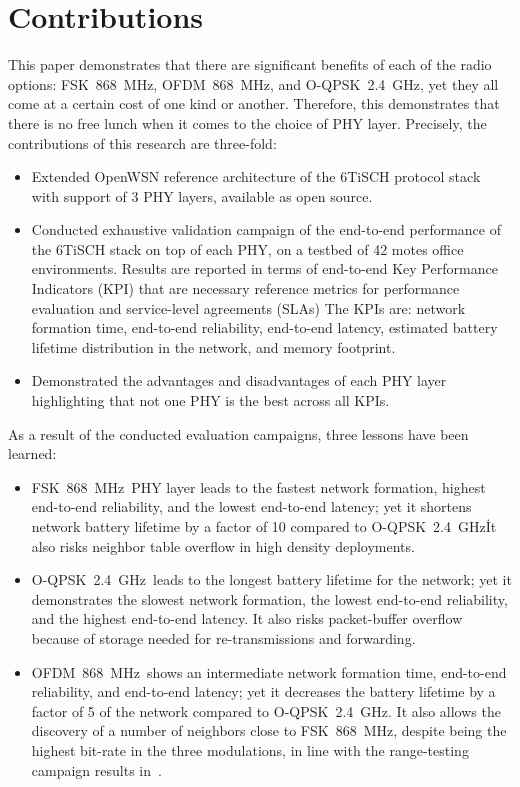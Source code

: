 \documentclass[sensors,article,submit,moreauthors,pdftex]{Definitions/mdpi}
\newcommand{\fsk}          {FSK~868~MHz}
\newcommand{\oqpsk}        {O-QPSK~2.4~GHz}
\newcommand{\ofdm}         {OFDM~868~MHz}
\begin{document}
\section{Contributions}
\label{sec:contributions}

This paper demonstrates that there are significant benefits of each of the radio options: \fsk, \ofdm, and \oqpsk, yet they all come at a certain cost of one kind or another.
Therefore, this demonstrates that there is no free lunch when it comes to the choice of PHY layer.
Precisely, the contributions of this research are three-fold:

\begin{itemize}
    \item Extended OpenWSN reference architecture of the 6TiSCH protocol stack with support of 3 PHY layers, available as open source.
    \item Conducted exhaustive validation campaign of the end-to-end performance of the 6TiSCH stack on top of each PHY, on a testbed of 42 motes office environments.
        Results are reported in terms of end-to-end Key Performance Indicators (KPI) that are necessary reference metrics for performance evaluation and service-level agreements (SLAs)
        The KPIs are: 
            network formation time,
            end-to-end reliability,
            end-to-end latency, 
            estimated battery lifetime distribution in the network, and
            memory footprint.
    \item Demonstrated the advantages and disadvantages of each PHY layer highlighting that not one PHY is the best across all KPIs.
\end{itemize}

As a result of the conducted evaluation campaigns, three lessons have been learned:


\begin{itemize}
    \item \fsk\ PHY layer leads to the fastest network formation, highest end-to-end reliability, and the lowest end-to-end latency; yet it shortens network battery lifetime by a factor of 10 compared to \oqpsk\. 
        It also risks neighbor table overflow in high density deployments.
    \item \oqpsk\ leads to the longest battery lifetime for the network; yet it demonstrates the slowest network formation, the lowest end-to-end reliability, and the highest end-to-end latency.
        It also risks packet-buffer overflow because of storage needed for re-transmissions and forwarding.
    \item \ofdm\ shows an intermediate network formation time, end-to-end reliability, and end-to-end latency; yet  it decreases the battery lifetime by a factor of 5 of the network compared to \oqpsk.
    It also allows the discovery of a number of neighbors close to \fsk, despite being the highest bit-rate in the three modulations, in line with the range-testing campaign results in~\cite{munoz18evaluationa}. 
\end{itemize}
\end{document}
